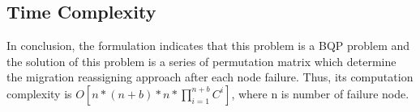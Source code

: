 
\subsection{Time Complexity}
In conclusion, the formulation indicates that this problem is a BQP problem and the solution of this problem is a series of permutation matrix  which determine the migration reassigning approach after each node failure. Thus, its computation complexity is $O[n*(n+b)*n*\prod_{i=1}^{n+b}C^i]$, where n is number of failure node.
